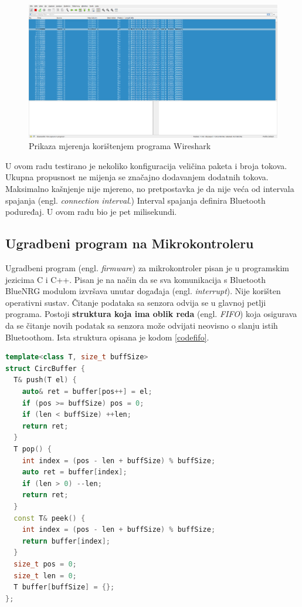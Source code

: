 \documentclass[times, utf8, diplomski]{diplomski}
\begin{document}
\begin{figure}[H]
\includegraphics[width=\textwidth]{wireshark_100sec_20230622_225645.png}
\centering
\caption{Prikaza mjerenja korištenjem programa Wireshark \cite{wireshark}}
\label{fig:wireshark}
\end{figure}

U ovom radu testirano je nekoliko konfiguracija veličina paketa i broja tokova. Ukupna propusnost ne mijenja se značajno dodavanjem dodatnih tokova. Maksimalno kašnjenje nije mjereno, no pretpostavka je da nije veća od intervala spajanja (engl. \textit{connection interval}.) Interval spajanja definira Bluetooth poduređaj. U ovom radu bio je pet milisekundi.

\subsection{Ugradbeni program na Mikrokontroleru}
Ugradbeni program (engl. \textit{firmware}) za mikrokontroler pisan je u programskim jezicima C i C++. Pisan je na način da se sva komunikacija s Bluetooth BlueNRG modulom izvršava unutar događaja (engl. \textit{interrupt}). Nije korišten operativni sustav. Čitanje podataka sa senzora odvija se u glavnoj petlji programa. Postoji \textbf{struktura koja ima oblik reda} (engl. \textit{FIFO}) koja osigurava da se čitanje novih podatak sa senzora može odvijati neovisno o slanju istih Bluetoothom. Ista struktura opisana je kodom \ref{codefifo}.

\begin{lstlisting}[language=c++, caption={\textit{FIFO} struktura koja omogućuje neovisan dohvat novih podataka i slanje najstarijih}, label={codefifo}]
template<class T, size_t buffSize>
struct CircBuffer {
  T& push(T el) {
    auto& ret = buffer[pos++] = el;
    if (pos >= buffSize) pos = 0;
    if (len < buffSize) ++len;
    return ret;
  }
  T pop() {
    int index = (pos - len + buffSize) % buffSize;
    auto ret = buffer[index];
    if (len > 0) --len;
    return ret;
  }
  const T& peek() {
    int index = (pos - len + buffSize) % buffSize;
    return buffer[index];
  }
  size_t pos = 0;
  size_t len = 0;
  T buffer[buffSize] = {};
};
\end{lstlisting}
\end{document}

